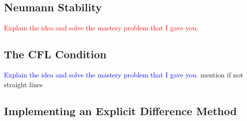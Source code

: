 \documentclass{article}
\newcommand{\red}[1]{\textcolor{red}{#1}}
\newcommand{\blue}[1]{\textcolor{blue}{#1}}
\begin{document}
\subsection{Neumann Stability}
\red{Explain the idea and solve the mastery problem that I gave you.}
 \subsection{The CFL Condition}
\blue{Explain the idea and solve the mastery problem that I gave you.}
 mention if not straight lines
 
\subsection{Implementing an Explicit Difference Method}
    
\end{document}

